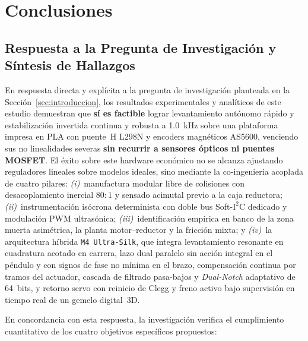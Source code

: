 \section{Conclusiones}\label{sec:conclusiones}

\subsection{Respuesta a la Pregunta de Investigación y Síntesis de Hallazgos}\label{subsec:resp_conclusiones}

En respuesta directa y explícita a la pregunta de investigación planteada en la Sección~\ref{sec:introduccion}, los resultados experimentales y analíticos de este estudio demuestran que \textbf{sí es factible} lograr levantamiento autónomo rápido y estabilización invertida continua y robusta a \qty{1.0}{\kilo\hertz} sobre una plataforma impresa en PLA con puente~H L298N y encoders magnéticos AS5600, venciendo sus no linealidades severas \textbf{sin recurrir a sensores ópticos ni puentes MOSFET}. El éxito sobre este hardware económico no se alcanza ajustando reguladores lineales sobre modelos ideales, sino mediante la co-ingeniería acoplada de cuatro pilares: \textit{(i)}~manufactura modular libre de colisiones con desacoplamiento inercial $80:1$ y sensado acimutal previo a la caja reductora; \textit{(ii)}~instrumentación isócrona determinista con doble bus Soft-$\text{I}^2\text{C}$ dedicado y modulación PWM ultrasónica; \textit{(iii)}~identificación empírica en banco de la zona muerta asimétrica, la planta motor--reductor y la fricción mixta; y \textit{(iv)}~la arquitectura híbrida \texttt{M4 Ultra-Silk}, que integra levantamiento resonante en cuadratura acotado en carrera, lazo dual paralelo sin acción integral en el péndulo y con signos de fase no mínima en el brazo, compensación continua por tramos del actuador, cascada de filtrado pasa-bajos y \textit{Dual-Notch} adaptativo de 64~bits, y retorno servo con reinicio de Clegg y freno activo bajo supervisión en tiempo real de un gemelo digital~3D.

En concordancia con esta respuesta, la investigación verifica el cumplimiento cuantitativo de los cuatro objetivos específicos propuestos:

